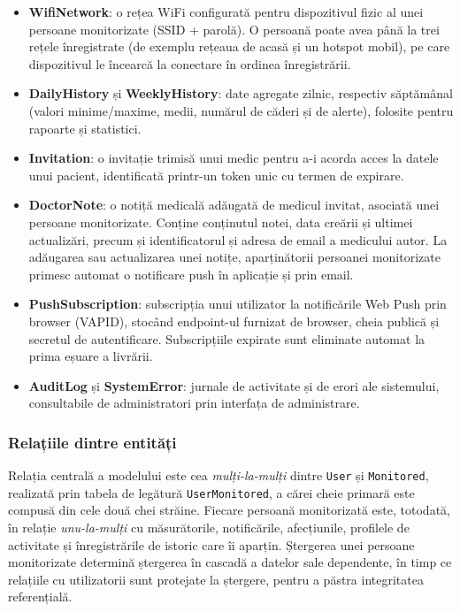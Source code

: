 \documentclass[12pt,a4paper,twoside]{article}
\begin{document}
\begin{itemize}[leftmargin=1.5em]
\item \textbf{WifiNetwork}: o rețea WiFi configurată pentru dispozitivul fizic al unei persoane monitorizate (SSID + parolă). O persoană poate avea până la trei rețele înregistrate (de exemplu rețeaua de acasă și un hotspot mobil), pe care dispozitivul le încearcă la conectare în ordinea înregistrării.
\item \textbf{DailyHistory} și \textbf{WeeklyHistory}: date agregate zilnic, respectiv săptămânal (valori minime/maxime, medii, numărul de căderi și de alerte), folosite pentru rapoarte și statistici.
\item \textbf{Invitation}: o invitație trimisă unui medic pentru a-i acorda acces la datele unui pacient, identificată printr-un token unic cu termen de expirare.
\item \textbf{DoctorNote}: o notiță medicală adăugată de medicul invitat, asociată unei persoane monitorizate. Conține conținutul notei, data creării și ultimei actualizări, precum și identificatorul și adresa de email a medicului autor. La adăugarea sau actualizarea unei notițe, aparținătorii persoanei monitorizate primesc automat o notificare push în aplicație și prin email.
\item \textbf{PushSubscription}: subscripția unui utilizator la notificările Web Push prin browser (VAPID), stocând endpoint-ul furnizat de browser, cheia publică și secretul de autentificare. Subscripțiile expirate sunt eliminate automat la prima eșuare a livrării.
\item \textbf{AuditLog} și \textbf{SystemError}: jurnale de activitate și de erori ale sistemului, consultabile de administratori prin interfața de administrare.
\end{itemize}

\subsubsection{Relațiile dintre entități}

Relația centrală a modelului este cea \textit{mulți-la-mulți} dintre \texttt{User} și \texttt{Monitored}, realizată prin tabela de legătură \texttt{UserMonitored}, a cărei cheie primară este compusă din cele două chei străine. Fiecare persoană monitorizată este, totodată, în relație \textit{unu-la-mulți} cu măsurătorile, notificările, afecțiunile, profilele de activitate și înregistrările de istoric care îi aparțin. Ștergerea unei persoane monitorizate determină ștergerea în cascadă a datelor sale dependente, în timp ce relațiile cu utilizatorii sunt protejate la ștergere, pentru a păstra integritatea referențială.
\end{document}
